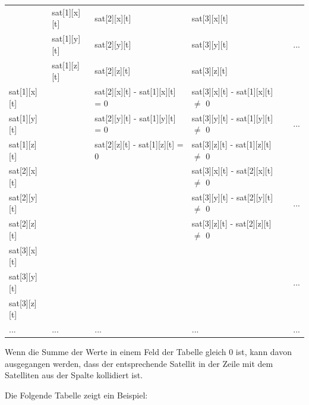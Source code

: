 \bigskip

\begin{tabular}{l | l | l | l | l}
  & sat[1][x][t] & sat[2][x][t] & sat[3][x][t] &  \\
  & sat[1][y][t] & sat[2][y][t] & sat[3][y][t] & ... \\
  & sat[1][z][t] & sat[2][z][t] & sat[3][z][t] &  \\\hline
 
 sat[1][x][t] &  & sat[2][x][t] - sat[1][x][t] = 0 & sat[3][x][t] - sat[1][x][t] \(\neq\) 0 &  \\
 sat[1][y][t] &  & sat[2][y][t] - sat[1][y][t] = 0 & sat[3][y][t] - sat[1][y][t] \(\neq\) 0 & ... \\
 sat[1][z][t] &  & sat[2][z][t] - sat[1][z][t] = 0 & sat[3][z][t] - sat[1][z][t] \(\neq\) 0 &  \\\hline
 
 sat[2][x][t] &  &  & sat[3][x][t] - sat[2][x][t] \(\neq\) 0 &  \\
 sat[2][y][t] &  &  & sat[3][y][t] - sat[2][y][t] \(\neq\) 0 & ... \\
 sat[2][z][t] &  &  & sat[3][z][t] - sat[2][z][t] \(\neq\) 0 &  \\\hline
 
 sat[3][x][t] &  &  &  &  \\
 sat[3][y][t] &  &  &  & ... \\
 sat[3][z][t] &  &  &  &  \\\hline
 
 ... & ... & ... & ... & ...
\end{tabular}

\bigskip

Wenn die Summe der Werte in einem Feld der Tabelle gleich 0 ist, kann davon ausgegangen werden, dass der
entsprechende Satellit in der Zeile mit dem Satelliten aus der Spalte kollidiert ist.
\par
Die Folgende Tabelle zeigt ein Beispiel:

\bigskip

